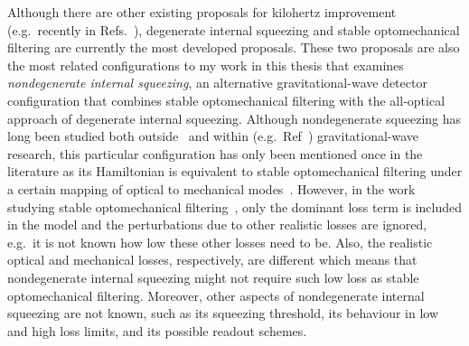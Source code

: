 Although there are other existing proposals for kilohertz improvement (e.g.\ recently in Refs.~\cite{hu2021quantum,Ganapathy_2021}), degenerate internal squeezing and stable optomechanical filtering are currently the most developed proposals. These two proposals are also the most related configurations to my work in this thesis that examines \emph{nondegenerate internal squeezing}, an alternative gravitational-wave detector configuration that combines stable optomechanical filtering with the all-optical approach of degenerate internal squeezing. %
Although nondegenerate squeezing has long been studied both outside~\cite{Andersen_2016} and within (e.g.\ Ref~\cite{Yap:19}) gravitational-wave research, this particular configuration has only been mentioned once in the literature as its Hamiltonian is equivalent to stable optomechanical filtering under a certain mapping of optical to mechanical modes~\cite{liBroadbandSensitivityImprovement2020}.
However, in the work studying stable optomechanical filtering~\cite{liBroadbandSensitivityImprovement2020,liEnhancingInterferometerSensitivity2021}, only the dominant loss term is included in the model and the perturbations due to other realistic losses are ignored, e.g.\ it is not known how low these other losses need to be. Also, the realistic optical and mechanical losses, respectively, are different which means that nondegenerate internal squeezing might not require such low loss as stable optomechanical filtering. Moreover, other aspects of nondegenerate internal squeezing are not known, such as its squeezing threshold, its behaviour in low and high loss limits, and its possible readout schemes.


